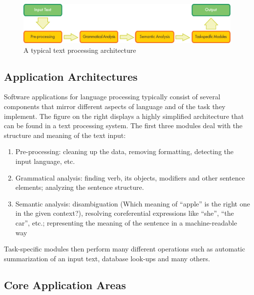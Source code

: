 \begin{multicols}{2}
\begin{figure}[b]
  \center
  \includegraphics[width=\textwidth]{../_media/english/text_processing_app_architecture}
  \caption{A typical text processing architecture}
  \label{fig:textprocessingarch_en}
\end{figure}


\subsection{Application Architectures}

Software applications for language processing typically consist of several components that mirror different aspects of language and of the task they implement. The figure on the right displays a highly simplified architecture that can be found in a text processing system. The first three modules deal with the structure and meaning of the text input:
\begin{enumerate}
  \item Pre-processing: cleaning up the data, removing formatting, detecting the input language, etc.
  \item Grammatical analysis: finding verb, its objects, modifiers and other sentence elements; analyzing the sentence structure.
  \item Semantic analysis: disambiguation (Which meaning of “apple” is the right one in the given context?), resolving coreferential expressions like “she”, “the car”, etc.; representing the meaning of the sentence in a machine-readable way
\end{enumerate}
Task-specific modules then perform many different operations such as automatic summarization of an input text, database look-ups and many others.
  
\subsection{Core Application Areas}


\end{multicols}
